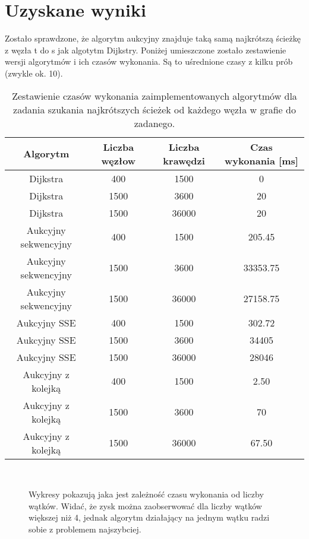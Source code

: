 \documentclass[12pt,a4paper]{article}
\begin{document}
\section{Uzyskane wyniki}
Zostało sprawdzone, że algorytm aukcyjny znajduje taką samą najkrótszą ścieżkę z węzła t do s jak algotytm Dijkstry. Poniżej umieszczone zostało zestawienie wersji algorytmów i ich czasów wykonania. Są to uśrednione czasy z kilku prób (zwykle ok. 10).
\begin{table}[h!b!p!]
\caption{Zestawienie czasów wykonania zaimplementowanych algorytmów dla zadania szukania najkrótszych ścieżek od każdego węzła w grafie do zadanego.}
\begin{center}
\begin{tabular}{ | c | c | c | c |}
\hline
Algorytm & Liczba węzłow & Liczba krawędzi & Czas wykonania [ms] \\ \hline
Dijkstra & 400 & 1500 & 0 \\ \hline
Dijkstra & 1500 & 3600 & 20 \\ \hline
Dijkstra & 1500 & 36000 & 20 \\ \hline
Aukcyjny sekwencyjny & 400 & 1500 & 205.45 \\ \hline
Aukcyjny sekwencyjny & 1500 & 3600 & 33353.75 \\ \hline
Aukcyjny sekwencyjny & 1500 & 36000 & 27158.75 \\ \hline
Aukcyjny SSE & 400 & 1500 & 302.72 \\ \hline
Aukcyjny SSE & 1500 & 3600 & 34405 \\ \hline
Aukcyjny SSE & 1500 & 36000 & 28046 \\ \hline
Aukcyjny z kolejką & 400 & 1500 & 2.50 \\ \hline
Aukcyjny z kolejką & 1500 & 3600 & 70 \\ \hline
Aukcyjny z kolejką & 1500 & 36000 & 67.50 \\ \hline
\end{tabular}
\end{center}
\end{table}
\begin{figure}[h!b!p!]
\centering
{}\hfill              
{}\\
\caption{Wykresy pokazują jaka jest zależność czasu wykonania od liczby wątków. Widać, że zysk można zaobserwować dla liczby wątków większej niż 4, jednak algorytm działający na jednym wątku radzi sobie z problemem najszybciej.}
\end{figure}
\end{document}
